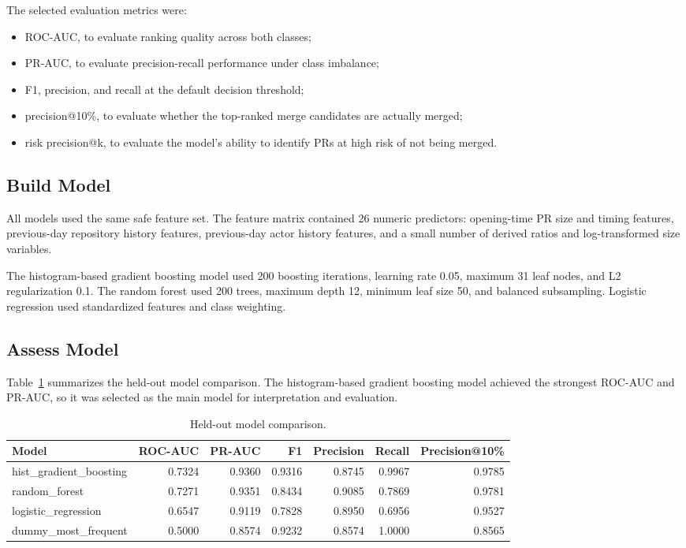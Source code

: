 The selected evaluation metrics were:

\begin{itemize}
    \item ROC-AUC, to evaluate ranking quality across both classes;
    \item PR-AUC, to evaluate precision-recall performance under class imbalance;
    \item F1, precision, and recall at the default decision threshold;
    \item precision@10\%, to evaluate whether the top-ranked merge candidates are actually merged;
    \item risk precision@k, to evaluate the model's ability to identify PRs at high risk of not being merged.
\end{itemize}

\subsection{Build Model}

All models used the same safe feature set. The feature matrix contained 26 numeric predictors: opening-time
PR size and timing features, previous-day repository history features, previous-day actor history features,
and a small number of derived ratios and log-transformed size variables.

The histogram-based gradient boosting model used 200 boosting iterations, learning rate 0.05, maximum 31 leaf
nodes, and L2 regularization 0.1. The random forest used 200 trees, maximum depth 12, minimum leaf size 50,
and balanced subsampling. Logistic regression used standardized features and class weighting.

\subsection{Assess Model}

Table~\ref{tab:model_results} summarizes the held-out model comparison. The histogram-based gradient boosting
model achieved the strongest ROC-AUC and PR-AUC, so it was selected as the main model for interpretation and evaluation.

\begin{table}[H]
    \centering
    \small
    \caption{Held-out model comparison.}
    \label{tab:model_results}
    \begin{tabular}{lrrrrrr}
        \toprule
        Model & ROC-AUC & PR-AUC & F1 & Precision & Recall & Precision@10\% \\
        \midrule
        hist\_gradient\_boosting & 0.7324 & 0.9360 & 0.9316 & 0.8745 & 0.9967 & 0.9785 \\
        random\_forest & 0.7271 & 0.9351 & 0.8434 & 0.9085 & 0.7869 & 0.9781 \\
        logistic\_regression & 0.6547 & 0.9119 & 0.7828 & 0.8950 & 0.6956 & 0.9527 \\
        dummy\_most\_frequent & 0.5000 & 0.8574 & 0.9232 & 0.8574 & 1.0000 & 0.8565 \\
        \bottomrule
    \end{tabular}
\end{table}

